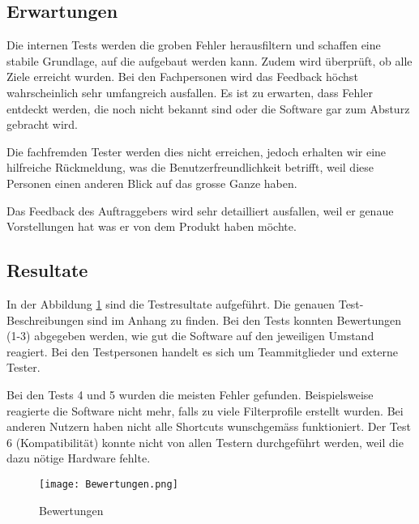 \subsection{Erwartungen} \label{subsec:validierung}
Die internen Tests werden die groben Fehler herausfiltern und schaffen eine stabile Grundlage, auf die aufgebaut werden kann. Zudem wird überprüft, ob alle Ziele erreicht wurden.
Bei den Fachpersonen wird das Feedback höchst wahrscheinlich sehr umfangreich ausfallen. Es ist zu erwarten, dass Fehler entdeckt werden, die noch nicht bekannt sind oder die Software gar zum Absturz gebracht wird. 

Die fachfremden Tester werden dies nicht erreichen, jedoch erhalten wir eine hilfreiche Rückmeldung, was die Benutzerfreundlichkeit betrifft, weil diese Personen einen anderen Blick auf das grosse Ganze haben. 

Das Feedback des Auftraggebers wird sehr detailliert ausfallen, weil er genaue Vorstellungen hat was er von dem Produkt haben möchte.

\subsection{Resultate} \label{subsec:validierung}

In der Abbildung \ref{fig:Bewertungen} sind die Testresultate aufgeführt. Die genauen Test-Beschreibungen sind im Anhang zu finden. Bei den Tests konnten Bewertungen (1-3) abgegeben werden, wie gut die Software auf den jeweiligen Umstand reagiert. Bei den Testpersonen handelt es sich um Teammitglieder und externe Tester. 

Bei den Tests 4 und 5 wurden die meisten Fehler gefunden. Beispielsweise reagierte die Software nicht mehr, falls zu viele Filterprofile erstellt wurden. Bei anderen Nutzern haben nicht alle Shortcuts wunschgemäss funktioniert. Der Test 6 (Kompatibilität) konnte nicht von allen Testern durchgeführt werden, weil die dazu nötige Hardware fehlte.           

\begin{figure}[H]
	\centering
	\texttt{[image: Bewertungen.png]}
	\caption{Bewertungen}
	\label{fig:Bewertungen}
\end{figure}